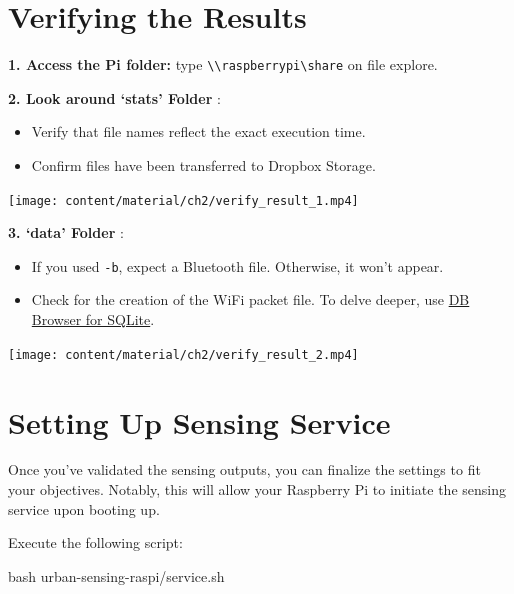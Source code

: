 \documentclass[
  letterpaper,
]{scrbook}
\newenvironment{Shaded}{\begin{snugshade}}{\end{snugshade}}
\newcommand{\FunctionTok}[1]{\textcolor[rgb]{0.28,0.35,0.67}{#1}}
\newcommand{\NormalTok}[1]{\textcolor[rgb]{0.00,0.23,0.31}{#1}}
\providecommand{\tightlist}{%
  \setlength{\itemsep}{0pt}\setlength{\parskip}{0pt}}\usepackage{longtable,booktabs,array}
\begin{document}
\hypertarget{verifying-the-results}{%
\section{Verifying the Results}\label{verifying-the-results}}

\textbf{1. Access the Pi folder:} type
\texttt{\textbackslash{}\textbackslash{}raspberrypi\textbackslash{}share}
on file explore.

\textbf{2. Look around `stats' Folder} :

\begin{itemize}
\tightlist
\item
  Verify that file names reflect the exact execution time.
\item
  Confirm files have been transferred to Dropbox Storage.
\end{itemize}

\texttt{[image: content/material/ch2/verify\_result\_1.mp4]}

\textbf{3. `data' Folder} :

\begin{itemize}
\tightlist
\item
  If you used \texttt{-b}, expect a Bluetooth file. Otherwise, it won't
  appear.
\item
  Check for the creation of the WiFi packet file. To delve deeper, use
  \href{https://sqlitebrowser.org/}{DB Browser for SQLite}.
\end{itemize}

\texttt{[image: content/material/ch2/verify\_result\_2.mp4]}

\hypertarget{setting-up-sensing-service}{%
\section{Setting Up Sensing Service}\label{setting-up-sensing-service}}

Once you've validated the sensing outputs, you can finalize the settings
to fit your objectives. Notably, this will allow your Raspberry Pi to
initiate the sensing service upon booting up.

Execute the following script:

\begin{Shaded}
\begin{Highlighting}[]
\FunctionTok{bash}\NormalTok{ urban{-}sensing{-}raspi/service.sh}
\end{Highlighting}
\end{Shaded}
\end{document}
